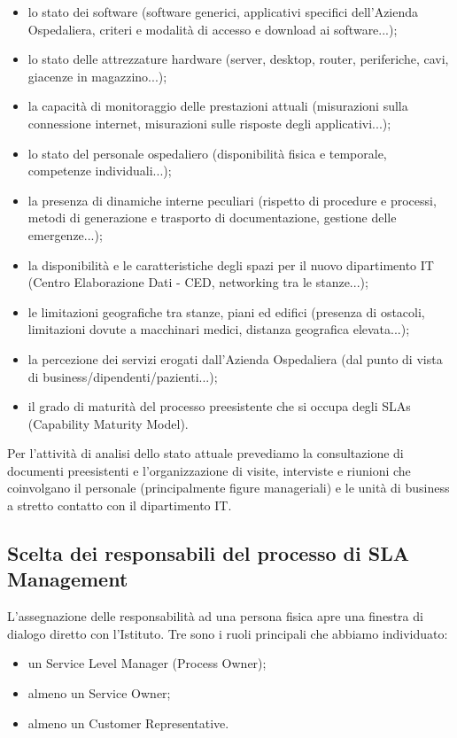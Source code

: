\begin{itemize}
	\item lo stato dei software (software generici, applicativi specifici dell'Azienda Ospedaliera, criteri e modalità di accesso e download ai software...);
    \item lo stato delle attrezzature hardware (server, desktop, router, periferiche, cavi, giacenze in magazzino...);
    \item la capacità di monitoraggio delle prestazioni attuali (misurazioni sulla connessione internet, misurazioni sulle risposte degli applicativi...);
    \item lo stato del personale ospedaliero (disponibilità fisica e temporale, competenze individuali...);
    \item la presenza di dinamiche interne peculiari (rispetto di procedure e processi, metodi di generazione e trasporto di documentazione, gestione delle emergenze...);
    \item la disponibilità e le caratteristiche degli spazi per il nuovo dipartimento IT (Centro Elaborazione Dati - CED, networking tra le stanze...);
    \item le limitazioni geografiche tra stanze, piani ed edifici (presenza di ostacoli, limitazioni dovute a macchinari medici, distanza geografica elevata...);
    \item la percezione dei servizi erogati dall'Azienda Ospedaliera (dal punto di vista di business/dipendenti/pazienti...);
    \item il grado di maturità del processo preesistente che si occupa degli SLAs (Capability Maturity Model).
\end{itemize}

Per l'attività di analisi dello stato attuale prevediamo la consultazione di documenti preesistenti e l'organizzazione di visite, interviste e riunioni che coinvolgano il personale (principalmente figure manageriali) e le unità di business a stretto contatto con il dipartimento IT.

\subsection{Scelta dei responsabili del processo di SLA Management}

L'assegnazione delle responsabilità ad una persona fisica apre una finestra di dialogo diretto con l'Istituto. Tre sono i ruoli principali che abbiamo individuato:

\begin{itemize}
	\item un Service Level Manager (Process Owner);
    \item almeno un Service Owner;
    \item almeno un Customer Representative.
\end{itemize}

